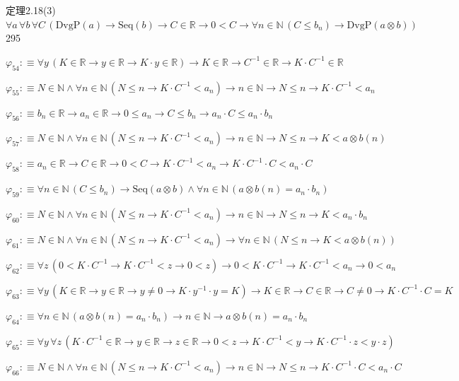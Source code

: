 \begin{fullproof}{定理2.18(3)}{$\forall a\,\forall b\,\forall C\,(\mathrm{DvgP}(a) \to \mathrm{Seq}(b) \to C \in \mathbb{R} \to 0 < C \to \forall n \in \mathbb{N}\,(C \leq b_{n}) \to \mathrm{DvgP}(a \otimes b))$}{295}
\begin{abbrevlist}
\item $\varphi_{54} :\equiv \forall y\,(K \in \mathbb{R} \to y \in \mathbb{R} \to K \cdot y \in \mathbb{R}) \to K \in \mathbb{R} \to C^{-1} \in \mathbb{R} \to K \cdot C^{-1} \in \mathbb{R}$
\item $\varphi_{55} :\equiv N \in \mathbb{N} \land \forall n \in \mathbb{N}\,(N \leq n \to K \cdot C^{-1} < a_{n}) \to n \in \mathbb{N} \to N \leq n \to K \cdot C^{-1} < a_{n}$
\item $\varphi_{56} :\equiv b_{n} \in \mathbb{R} \to a_{n} \in \mathbb{R} \to 0 \leq a_{n} \to C \leq b_{n} \to a_{n} \cdot C \leq a_{n} \cdot b_{n}$
\item $\varphi_{57} :\equiv N \in \mathbb{N} \land \forall n \in \mathbb{N}\,(N \leq n \to K \cdot C^{-1} < a_{n}) \to n \in \mathbb{N} \to N \leq n \to K < a \otimes b(n)$
\item $\varphi_{58} :\equiv a_{n} \in \mathbb{R} \to C \in \mathbb{R} \to 0 < C \to K \cdot C^{-1} < a_{n} \to K \cdot C^{-1} \cdot C < a_{n} \cdot C$
\item $\varphi_{59} :\equiv \forall n \in \mathbb{N}\,(C \leq b_{n}) \to \mathrm{Seq}(a \otimes b) \land \forall n \in \mathbb{N}\,(a \otimes b(n) = a_{n} \cdot b_{n})$
\item $\varphi_{60} :\equiv N \in \mathbb{N} \land \forall n \in \mathbb{N}\,(N \leq n \to K \cdot C^{-1} < a_{n}) \to n \in \mathbb{N} \to N \leq n \to K < a_{n} \cdot b_{n}$
\item $\varphi_{61} :\equiv N \in \mathbb{N} \land \forall n \in \mathbb{N}\,(N \leq n \to K \cdot C^{-1} < a_{n}) \to \forall n \in \mathbb{N}\,(N \leq n \to K < a \otimes b(n))$
\item $\varphi_{62} :\equiv \forall z\,(0 < K \cdot C^{-1} \to K \cdot C^{-1} < z \to 0 < z) \to 0 < K \cdot C^{-1} \to K \cdot C^{-1} < a_{n} \to 0 < a_{n}$
\item $\varphi_{63} :\equiv \forall y\,(K \in \mathbb{R} \to y \in \mathbb{R} \to y \neq 0 \to K \cdot y^{-1} \cdot y = K) \to K \in \mathbb{R} \to C \in \mathbb{R} \to C \neq 0 \to K \cdot C^{-1} \cdot C = K$
\item $\varphi_{64} :\equiv \forall n \in \mathbb{N}\,(a \otimes b(n) = a_{n} \cdot b_{n}) \to n \in \mathbb{N} \to a \otimes b(n) = a_{n} \cdot b_{n}$
\item $\varphi_{65} :\equiv \forall y\,\forall z\,(K \cdot C^{-1} \in \mathbb{R} \to y \in \mathbb{R} \to z \in \mathbb{R} \to 0 < z \to K \cdot C^{-1} < y \to K \cdot C^{-1} \cdot z < y \cdot z)$
\item $\varphi_{66} :\equiv N \in \mathbb{N} \land \forall n \in \mathbb{N}\,(N \leq n \to K \cdot C^{-1} < a_{n}) \to n \in \mathbb{N} \to N \leq n \to K \cdot C^{-1} \cdot C < a_{n} \cdot C$

\end{abbrevlist}
\end{fullproof}
